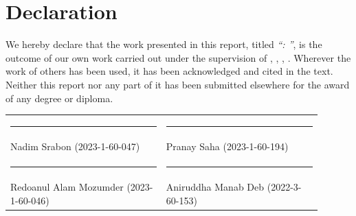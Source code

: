 \chapter*{Declaration}

We hereby declare that the work presented in this report, titled
\textit{``\ThesisTitle: \ThesisSubtitle''}, is the outcome of our own
work carried out under the supervision of \Supervisor, \SupervisorTitle,
\Department, \University. Wherever the work of others has been used, it
has been acknowledged and cited in the text. Neither this report nor any
part of it has been submitted elsewhere for the award of any degree or
diploma.

\vspace{1.5cm}
\noindent
\begin{tabular}{@{}p{0.45\linewidth}p{0.45\linewidth}@{}}
\rule{5.5cm}{0.4pt}            & \rule{5.5cm}{0.4pt} \\
Nadim Srabon (2023-1-60-047)    & Pranay Saha (2023-1-60-194) \\[1.6cm]
\rule{5.5cm}{0.4pt}            & \rule{5.5cm}{0.4pt} \\
Redoanul Alam Mozumder (2023-1-60-046) & Aniruddha Manab Deb (2022-3-60-153) \\
\end{tabular}
